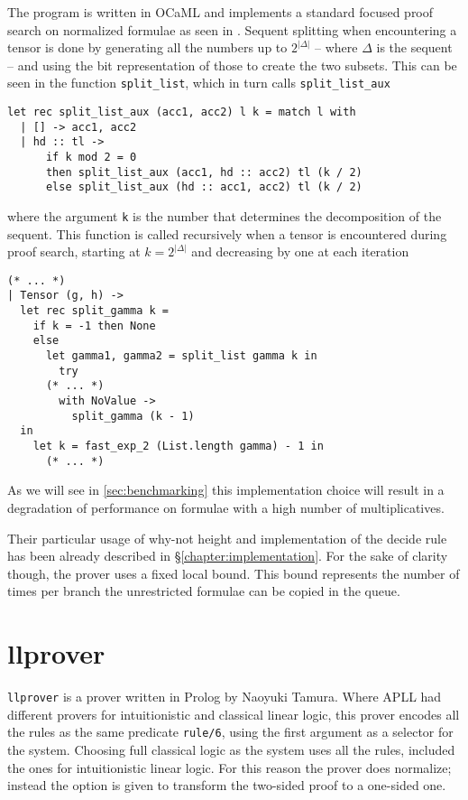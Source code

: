 The program is written in OCaML and implements a standard focused proof search on normalized formulae as seen in \cite{LiangMiller}.
Sequent splitting when encountering a tensor is done by generating all the numbers up to $2^{|\Delta|}$ -- where $\Delta$ is the sequent -- and using the bit representation of those to create the two subsets.
This can be seen in the function \texttt{split\_list}, which in turn calls \texttt{split\_list\_aux}
\begin{verbatim}
let rec split_list_aux (acc1, acc2) l k = match l with
  | [] -> acc1, acc2
  | hd :: tl -> 
      if k mod 2 = 0 
      then split_list_aux (acc1, hd :: acc2) tl (k / 2)
      else split_list_aux (hd :: acc1, acc2) tl (k / 2)
\end{verbatim}
where the argument \texttt{k} is the number that determines the decomposition of the sequent.
This function is called recursively when a tensor is encountered during proof search, starting at $ k = 2^{|\Delta|}$ and decreasing by one at each iteration
\begin{verbatim}
(* ... *)
| Tensor (g, h) ->
  let rec split_gamma k = 
    if k = -1 then None
    else
      let gamma1, gamma2 = split_list gamma k in
        try
	  (* ... *)
        with NoValue ->
          split_gamma (k - 1) 
  in
    let k = fast_exp_2 (List.length gamma) - 1 in
      (* ... *)
\end{verbatim}
As we will see in \ref{sec:benchmarking} this implementation choice will result in a degradation of performance on formulae with a high number of multiplicatives.

Their particular usage of why-not height and implementation of the decide rule has been already described in \S\ref{chapter:implementation}.
For the sake of clarity though, the prover uses a fixed local bound.
This bound represents the number of times per branch the unrestricted formulae can be copied in the queue.

\section{llprover}
\texttt{llprover} is a prover written in Prolog by Naoyuki Tamura.
Where APLL had different provers for intuitionistic and classical linear logic, this prover encodes all the rules as the same predicate \texttt{rule/6}, using the first argument as a selector for the system.
Choosing full classical logic as the system uses all the rules, included the ones for intuitionistic linear logic.
For this reason the prover does normalize; instead the option is given to transform the two-sided proof to a one-sided one.

